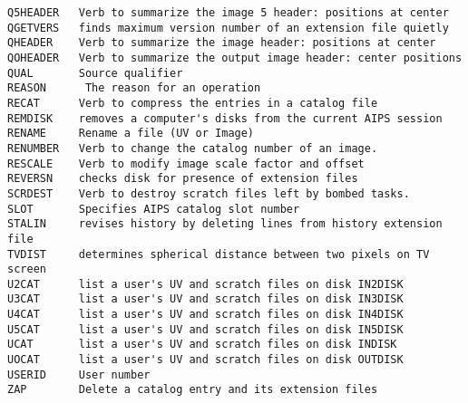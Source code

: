\begin{verbatim}
Q5HEADER   Verb to summarize the image 5 header: positions at center
QGETVERS   finds maximum version number of an extension file quietly
QHEADER    Verb to summarize the image header: positions at center
QOHEADER   Verb to summarize the output image header: center positions
QUAL       Source qualifier
REASON      The reason for an operation
RECAT      Verb to compress the entries in a catalog file
REMDISK    removes a computer's disks from the current AIPS session
RENAME     Rename a file (UV or Image)
RENUMBER   Verb to change the catalog number of an image.
RESCALE    Verb to modify image scale factor and offset
REVERSN    checks disk for presence of extension files
SCRDEST    Verb to destroy scratch files left by bombed tasks.
SLOT       Specifies AIPS catalog slot number
STALIN     revises history by deleting lines from history extension file
TVDIST     determines spherical distance between two pixels on TV screen
U2CAT      list a user's UV and scratch files on disk IN2DISK
U3CAT      list a user's UV and scratch files on disk IN3DISK
U4CAT      list a user's UV and scratch files on disk IN4DISK
U5CAT      list a user's UV and scratch files on disk IN5DISK
UCAT       list a user's UV and scratch files on disk INDISK
UOCAT      list a user's UV and scratch files on disk OUTDISK
USERID     User number
ZAP        Delete a catalog entry and its extension files
\end{verbatim}\eve



